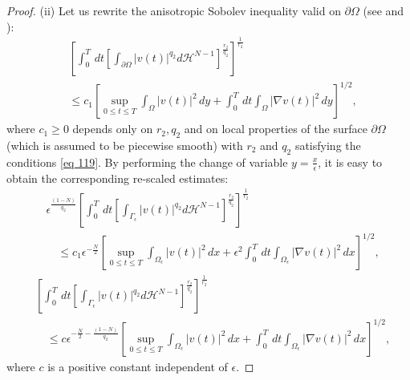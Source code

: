 \begin{proof}
(ii) Let us rewrite the anisotropic Sobolev inequality valid on $\partial \Omega$ (see \cite{Ladyzenskaja_Solonnikov_Uralceva_1968} and \cite{Nittka_2011}):
\begin{equation}
  \begin{aligned}
&{\left[\int_{0}^{T} \, d  t\left[\int_{\partial \Omega}|v(t)|^{q_{2}} d \mathcal{H}^{N-1}\right]^{\frac{r_{2}}{q_{2}}}\right]^{\frac{1}{r_{2}}}} \\
&\leq c_{1}\left[\sup _{0 \leq t \leq T} \int_{\Omega}|v(t)|^{2} \, d  y+\int_{0}^{T} \, d  t \int_{\Omega}|\nabla v(t)|^{2} \, d  y\right]^{1 / 2},
\end{aligned}
\label{124}\end{equation}
where $c_{1} \geq 0$ depends only on $r_{2}, q_{2}$ and on local properties of the surface $\partial \Omega$ (which is assumed to be piecewise smooth) with $r_{2}$ and $q_{2}$ satisfying the conditions \eqref{eq 119}. By performing the change of variable $y=\frac{x}{\epsilon}$, it is easy to obtain the corresponding re-scaled estimates:
\begin{equation}
  \begin{aligned}
&\epsilon^{\frac{(1-N)}{q_{2}}}\left[\int_{0}^{T} \, d  t\left[\int_{\Gamma_{\epsilon}}|v(t)|^{q_{2}} d \mathcal{H}^{N-1}\right]^{\frac{r_{2}}{q_{2}}}\right]^{\frac{1}{r_{2}}} \\
&\quad \leq c_{1} \epsilon^{-\frac{N}{2}}\left[\sup _{0 \leq t \leq T} \int_{\Omega_{\epsilon}}|v(t)|^{2} \, d  x+\epsilon^{2} \int_{0}^{T} \, d  t \int_{\Omega_{\epsilon}}|\nabla v(t)|^{2} \, d  x\right]^{1 / 2},
\end{aligned}
\label{eq 125}\end{equation}
\begin{equation}
\begin{aligned}
&{\left[\int_{0}^{T} \, d  t\left[\int_{\Gamma_{\epsilon}}|v(t)|^{q_{2}} d \mathcal{H}^{N-1}\right]^{\frac{r_{2}}{q_{2}}}\right]^{\frac{1}{r_{2}}}} \\
&\quad \leq c \epsilon^{-\frac{N}{2}-\frac{(1-N)}{q_{2}}}\left[\sup _{0 \leq t \leq T} \int_{\Omega_{\epsilon}}|v(t)|^{2} \, d  x+\int_{0}^{T} \, d  t \int_{\Omega_{\epsilon}}|\nabla v(t)|^{2} \, d  x\right]^{1 / 2},
\end{aligned}
\label{eq 126}\end{equation}
where $c$ is a positive constant independent of $\epsilon$.
\end{proof}
